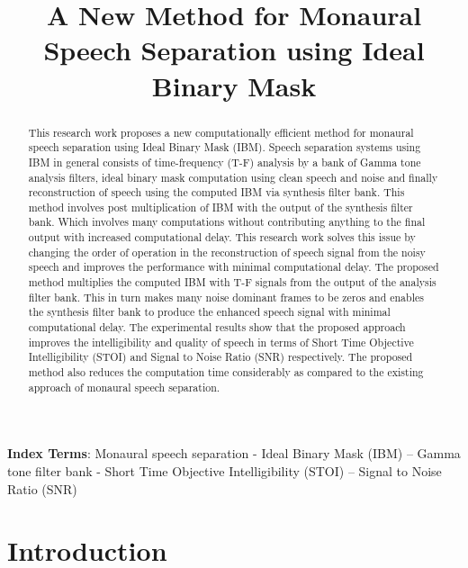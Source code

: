 \documentclass[a4paper]{article}
\title{A New Method for Monaural Speech Separation using Ideal Binary Mask}
\begin{document}
\maketitle
% 
\begin{abstract}
  This research work proposes a new computationally efficient method for monaural speech separation using Ideal Binary Mask (IBM). Speech separation systems using IBM in general consists of time-frequency (T-F) analysis by a bank of Gamma tone analysis filters, ideal binary mask computation using clean speech and noise and finally reconstruction of speech using the computed IBM via synthesis filter bank. This method involves post multiplication of IBM with the output of the synthesis filter bank. Which involves many computations without contributing anything to the final output with increased computational delay. This research work solves this issue by changing the order of operation in the reconstruction of speech signal from the noisy speech and improves the performance with minimal computational delay. The proposed method multiplies the computed IBM with T-F signals from the output of the analysis filter bank. This in turn makes many noise dominant frames to be zeros and enables the synthesis filter bank to produce the enhanced speech signal with minimal computational delay. The experimental results show that the proposed approach improves the intelligibility and quality of speech in terms of Short Time Objective Intelligibility (STOI) and Signal to Noise Ratio (SNR) respectively. The proposed method also reduces the computation time considerably as compared to the existing approach of monaural speech separation.


\end{abstract}
\noindent\textbf{Index Terms}: Monaural speech separation - Ideal Binary Mask (IBM) – Gamma tone filter bank - Short Time Objective Intelligibility (STOI) – Signal to Noise Ratio (SNR)

\section{Introduction}
\end{document}
